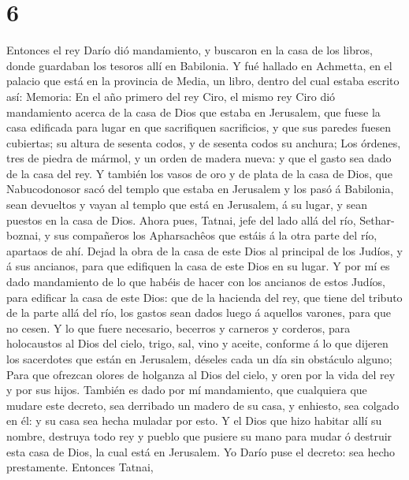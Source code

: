\hypertarget{section-5}{%
\section{6}\label{section-5}}

 Entonces el rey Darío dió mandamiento, y buscaron en la
casa de los libros, donde guardaban los tesoros allí en Babilonia.
 Y fué hallado en Achmetta, en el palacio que está en la
provincia de Media, un libro, dentro del cual estaba escrito así:
Memoria:  En el año primero del rey Ciro, el mismo rey
Ciro dió mandamiento acerca de la casa de Dios que estaba en Jerusalem,
que fuese la casa edificada para lugar en que sacrifiquen sacrificios, y
que sus paredes fuesen cubiertas; su altura de sesenta codos, y de
sesenta codos su anchura;  Los órdenes, tres de piedra de
mármol, y un orden de madera nueva: y que el gasto sea dado de la casa
del rey.  Y también los vasos de oro y de plata de la casa
de Dios, que Nabucodonosor sacó del templo que estaba en Jerusalem y los
pasó á Babilonia, sean devueltos y vayan al templo que está en
Jerusalem, á su lugar, y sean puestos en la casa de Dios. 
Ahora pues, Tatnai, jefe del lado allá del río, Sethar-boznai, y sus
compañeros los Apharsachêos que estáis á la otra parte del río, apartaos
de ahí.  Dejad la obra de la casa de este Dios al
principal de los Judíos, y á sus ancianos, para que edifiquen la casa de
este Dios en su lugar.  Y por mí es dado mandamiento de lo
que habéis de hacer con los ancianos de estos Judíos, para edificar la
casa de este Dios: que de la hacienda del rey, que tiene del tributo de
la parte allá del río, los gastos sean dados luego á aquellos varones,
para que no cesen.  Y lo que fuere necesario, becerros y
carneros y corderos, para holocaustos al Dios del cielo, trigo, sal,
vino y aceite, conforme á lo que dijeren los sacerdotes que están en
Jerusalem, déseles cada un día sin obstáculo alguno; 
Para que ofrezcan olores de holganza al Dios del cielo, y oren por la
vida del rey y por sus hijos.  También es dado por mí
mandamiento, que cualquiera que mudare este decreto, sea derribado un
madero de su casa, y enhiesto, sea colgado en él: y su casa sea hecha
muladar por esto.  Y el Dios que hizo habitar allí su
nombre, destruya todo rey y pueblo que pusiere su mano para mudar ó
destruir esta casa de Dios, la cual está en Jerusalem. Yo Darío puse el
decreto: sea hecho prestamente.  Entonces Tatnai,
